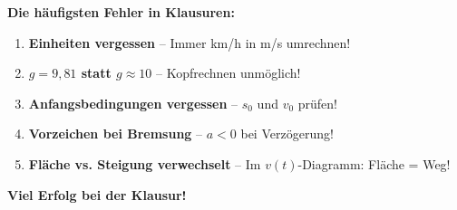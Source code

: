 \documentclass[11pt,a4paper]{article}
\begin{document}
\vspace{0.5cm}

\begin{warnung}
\textbf{Die häufigsten Fehler in Klausuren:}
\begin{enumerate}
\item \textbf{Einheiten vergessen} -- Immer km/h in m/s umrechnen!
\item \textbf{$g = 9{,}81$ statt $g \approx 10$} -- Kopfrechnen unmöglich!
\item \textbf{Anfangsbedingungen vergessen} -- $s_0$ und $v_0$ prüfen!
\item \textbf{Vorzeichen bei Bremsung} -- $a < 0$ bei Verzögerung!
\item \textbf{Fläche vs. Steigung verwechselt} -- Im $v(t)$-Diagramm: Fläche = Weg!
\end{enumerate}
\end{warnung}

\vspace{1cm}

\begin{center}
\large\textbf{Viel Erfolg bei der Klausur!}
\end{center}
\end{document}

